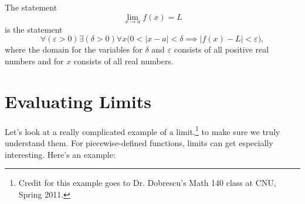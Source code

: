 The statement
\[ \lim_{x \to a} f(x) = L \]
is the statement
\begin{equation}
  \forall (\varepsilon > 0) \exists (\delta>0) \forall x \Big(0 < | x -a| < \delta \implies
  \big|f(x)-L\big| < \varepsilon\Big),
  \label{eq:e_d_limit}
\end{equation}
where the domain for the variables for $\delta$ and $\varepsilon$ consists of
all positive real numbers and for $x$ consists of all real numbers.

\section{Evaluating Limits}
Let's look at a really complicated example of a limit,\footnote{Credit for this example goes to Dr. Dobrescu's Math 140 class at CNU, Spring 2011.} to make sure we truly understand them.
For piecewise-defined functions, limits can get especially interesting. Here's an example:
